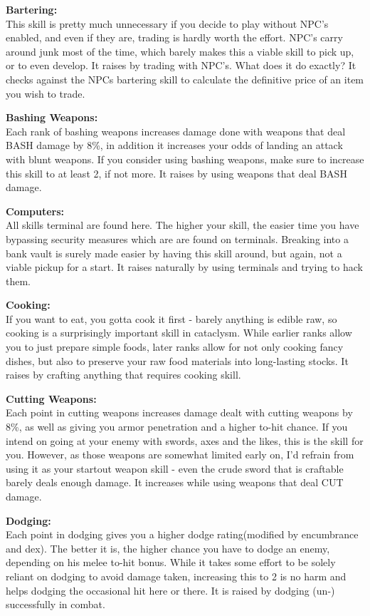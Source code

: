 \documentclass[11pt]{report}
\begin{document}
\textbf{Bartering:}\\This skill is pretty much unnecessary if you decide to play without NPC's enabled, and even if they are, trading is hardly worth the effort. NPC's carry around junk most of the time, which barely makes this a viable skill to pick up, or to even develop. It raises by trading with NPC's. What does it do exactly? It checks against the NPCs bartering skill to calculate the definitive price of an item you wish to trade.

\textbf{Bashing Weapons:}\\Each rank of bashing weapons increases damage done with weapons that deal BASH damage by 8\%, in addition it increases your odds of landing an attack with blunt weapons. If you consider using bashing weapons, make sure to increase this skill to at least 2, if not more. It raises by using weapons that deal BASH damage.

\textbf{Computers:}\\All skills terminal are found here. The higher your skill, the easier time you have bypassing security measures which are are found on terminals. Breaking into a bank vault is surely made easier by having this skill around, but again, not a viable pickup for a start. It raises naturally by using terminals and trying to hack them.

\textbf{Cooking:}\\If you want to eat, you gotta cook it first - barely anything is edible raw, so cooking is a surprisingly important skill in cataclysm. While earlier ranks allow you to just prepare simple foods, later ranks allow for not only cooking fancy dishes, but also to preserve your raw food materials into long-lasting stocks. It raises by crafting anything that requires cooking skill.

\textbf{Cutting Weapons:}\\Each point in cutting weapons increases damage dealt with cutting weapons by 8\%, as well as giving you armor penetration and a higher to-hit chance. If you intend on going at your enemy with swords, axes and the likes, this is the skill for you. However, as those weapons are somewhat limited early on, I'd refrain from using it as your startout weapon skill - even the crude sword that is craftable barely deals enough damage. It increases while using weapons that deal CUT damage.

\textbf{Dodging:}\\Each point in dodging gives you a higher dodge rating(modified by encumbrance and dex). The better it is, the higher chance you have to dodge an enemy, depending on his melee to-hit bonus. While it takes some effort to be solely reliant on dodging to avoid damage taken, increasing this to 2 is no harm and helps dodging the occasional hit here or there. It is raised by dodging (un-) successfully in combat.
\end{document}
